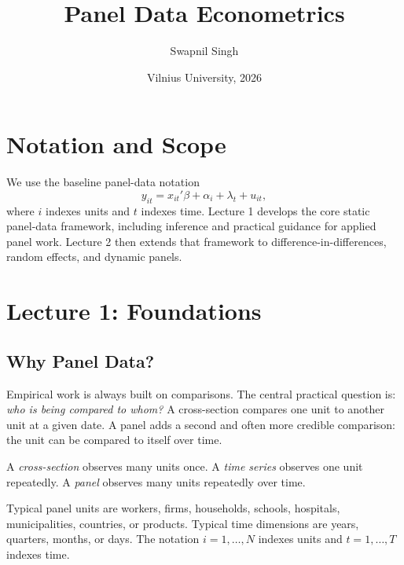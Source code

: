 

\title{Panel Data Econometrics}
\author{Swapnil Singh}
\date{Vilnius University, 2026}

\DeclareMathOperator{\Cov}{Cov}
\DeclareMathOperator{\Var}{Var}
\newcommand{\plim}{\operatorname*{plim}}



\maketitle
\tableofcontents

\section*{Notation and Scope}
We use the baseline panel-data notation
\[
y_{it} = x_{it}'\beta + \alpha_i + \lambda_t + u_{it},
\]
where $i$ indexes units and $t$ indexes time. Lecture 1 develops the core static panel-data framework, including inference and practical guidance for applied panel work. Lecture 2 then extends that framework to difference-in-differences, random effects, and dynamic panels.

\section{Lecture 1: Foundations}

\subsection{Why Panel Data?}
Empirical work is always built on comparisons. The central practical question is: \emph{who is being compared to whom?} A cross-section compares one unit to another unit at a given date. A panel adds a second and often more credible comparison: the unit can be compared to itself over time.

\begin{defN}
A \emph{cross-section} observes many units once. A \emph{time series} observes one unit repeatedly. A \emph{panel} observes many units repeatedly over time.
\end{defN}

Typical panel units are workers, firms, households, schools, hospitals, municipalities, countries, or products. Typical time dimensions are years, quarters, months, or days. The notation $i=1,\ldots,N$ indexes units and $t=1,\ldots,T$ indexes time.

